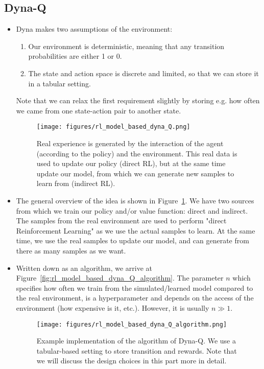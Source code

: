 \subsection{Dyna-Q}
\begin{itemize}
	\item Dyna makes two assumptions of the environment:
	\begin{enumerate}
		\item Our environment is deterministic, meaning that any transition probabilities are either 1 or 0. 
		\item The state and action space is discrete and limited, so that we can store it in a tabular setting.
	\end{enumerate}
	Note that we can relax the first requirement slightly by storing e.g. how often we came from one state-action pair to another state.
	\begin{figure}[ht!]
		\centering
		\texttt{[image: figures/rl\_model\_based\_dyna\_Q.png]}
		\caption{Real experience is generated by the interaction of the agent (according to the policy) and the environment. This real data is used to update our policy (direct RL), but at the same time update our model, from which we can generate new samples to learn from (indirect RL).}
		\label{fig:rl_model_based_dyna_Q}
	\end{figure}
	\item The general overview of the idea is shown in Figure~\ref{fig:rl_model_based_dyna_Q}. We have two sources from which we train our policy and/or value function: direct and indirect. The samples from the real environment are used to perform "direct Reinforcement Learning" as we use the actual samples to learn. At the same time, we use the real samples to update our model, and can generate from there as many samples as we want.
	\item Written down as an algorithm, we arrive at Figure~\ref{fig:rl_model_based_dyna_Q_algorithm}. The parameter $n$ which specifies how often we train from the simulated/learned model compared to the real environment, is a hyperparameter and depends on the access of the environment (how expensive is it, etc.). However, it is usually $n\gg 1$.
	\begin{figure}[ht!]
		\centering
		\texttt{[image: figures/rl\_model\_based\_dyna\_Q\_algorithm.png]}
		\caption{Example implementation of the algorithm of Dyna-Q. We use a tabular-based setting to store transition and rewards. Note that we will discuss the design choices in this part more in detail.}

\end{figure}
\end{itemize}

